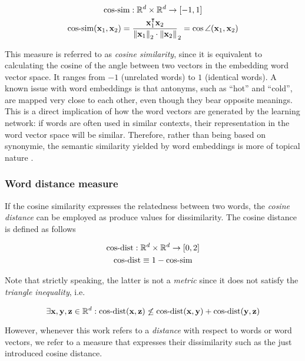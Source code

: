 \begin{gather*}
\mathit{\text{cos-sim}}: \mathbb{R}^d \times \mathbb{R}^d \to [-1, 1] \\
\mathit{\text{cos-sim}}(\mathbf{x}_1, \mathbf{x}_2) =
\frac{\mathbf{x}_1^\intercal\mathbf{x}_2}{\left\lVert\mathbf{x}_1\right\rVert_2 \cdot
\left\lVert\mathbf{x}_2\right\rVert}_2 = \cos \angle (\mathbf{x}_1, \mathbf{x}_2)
\end{gather*}

This measure is referred to as \emph{cosine similarity}, since it is
equivalent to calculating the cosine of the angle between two vectors in the
embedding word vector space. It ranges from $-1$ (unrelated words) to $1$
(identical words). A known issue with word embeddings is that antonyms, such as ``hot'' and ``cold'', 
are mapped very close to each other, even though they bear opposite meanings. 
This is a direct implication of how the word vectors are generated by the learning network: if words are often used in similar contexts, 
their representation in the word vector space will be similar. Therefore, rather than being based on synonymie,  
the semantic similarity yielded by word embeddings is more of topical nature \cite{lu2015deep}.

\subsubsection{Word distance measure}
If the cosine similarity expresses the relatedness between two words, the \emph{cosine distance} can be employed
as produce values for dissimilarity. The cosine distance is defined as follows 

\begin{gather*}
\mathit{\text{cos-dist}}: \mathbb{R}^d \times \mathbb{R}^d \to [0, 2] \\
\mathit{\text{cos-dist}} \equiv 1 - \mathit{\text{cos-sim}}
\end{gather*}

Note that strictly speaking, the latter is not
a \emph{metric} since it does not satisfy the \emph{triangle
inequality}, i.e.

\begin{equation*}
\exists \mathbf{x},\mathbf{y},\mathbf{z} \in \mathbb{R}^d:
\mathit{\text{cos-dist}}(\mathbf{x},\mathbf{z}) \not\leq
\mathit{\text{cos-dist}}(\mathbf{x},\mathbf{y}) +
\mathit{\text{cos-dist}}(\mathbf{y},\mathbf{z})
\end{equation*}

However, whenever this work refers to a \emph{distance} with respect to
words or word vectors, we refer to a measure that expresses their dissimilarity
such as the just introduced cosine distance.


